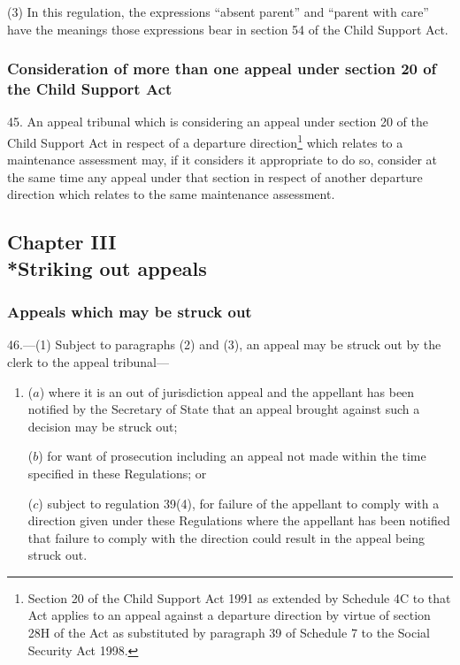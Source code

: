 \documentclass[12pt,a4paper]{article}
\begin{document}
(3) In this regulation, the expressions “absent parent” and “parent with care” have the meanings those expressions bear in section 54 of the Child Support Act.

\subsubsection[45. Consideration of more than one appeal under section 20 of the Child Support Act]{Consideration of more than one appeal under section 20 of the Child Support Act}

45.  An appeal tribunal which is considering an appeal under section 20 of the Child Support Act in respect of a departure direction\footnote{\frenchspacing Section 20 of the Child Support Act 1991 as extended by Schedule 4C to that Act applies to an appeal against a departure direction by virtue of section 28H of the Act as substituted by paragraph 39 of Schedule 7 to the Social Security Act 1998.} which relates to a maintenance assessment may, if it considers it appropriate to do so, consider at the same time any appeal under that section in respect of another departure direction which relates to the same maintenance assessment.

\subsection[Chapter III --- Striking out appeals]{Chapter III\\*Striking out appeals}

\subsubsection[46. Appeals which may be struck out]{Appeals which may be struck out}

\renewcommand\parthead{--- Part V Chapter III}

46.—(1) Subject to paragraphs (2) and (3), an appeal may be struck out by the clerk to the appeal tribunal—
\begin{enumerate}\item[]
($a$) where it is an out of jurisdiction appeal and the appellant has been notified by the Secretary of State that an appeal brought against such a decision may be struck out;

($b$) for want of prosecution including an appeal not made within the time specified in these Regulations; or

($c$) subject to regulation 39(4), for failure of the appellant to comply with a direction given under these Regulations where the appellant has been notified that failure to comply with the direction could result in the appeal being struck out.
\end{enumerate}
\end{document}
